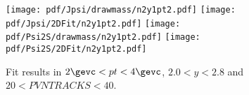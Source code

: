 \begin{figure}[H]
\begin{center}
\texttt{[image: pdf/Jpsi/drawmass/n2y1pt2.pdf]}
\texttt{[image: pdf/Jpsi/2DFit/n2y1pt2.pdf]}
\vspace*{-0.5cm}
\texttt{[image: pdf/Psi2S/drawmass/n2y1pt2.pdf]}
\texttt{[image: pdf/Psi2S/2DFit/n2y1pt2.pdf]}
\vspace*{-0.5cm}
\end{center}
\caption{Fit results in $2\gevc<pt<4\gevc$, $2.0<y<2.8$ and $20<PVNTRACKS<40$.}
\label{Fitn2y1pt2}
\end{figure}
